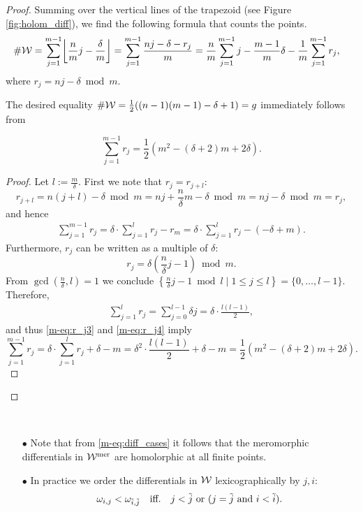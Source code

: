 \documentclass[main.tex]{subfiles}
\begin{document}
\begin{proof}
Summing over the vertical lines of the trapezoid
(see Figure \ref{fig:holom_diff}), we find the following formula that counts the points.
     \begin{align}\label{eq:r_j}
 \#\W & = \sum_{j = 1}^{m-1} \floor*{\frac{n}{m}j - \frac{\delta}{m}} = \sum_{j = 1}^{m-1} \frac{nj-\delta-r_j}{m} =
  \frac{n}{m} \sum_{j=1}^{m-1} j - \frac{m-1}{m}\delta - \frac{1}{m} \sum_{j=1}^{m-1} r_j,
     \end{align}
      where $r_j = nj - \delta  \bmod m$.

The desired equality  $\#\mathcal{W} = \frac{1}{2}((n-1)(m-1)-\delta+1) = g$ immediately follows from
\begin{lemma}
      \begin{equation*}\label{eq:r_j2}
       \sum_{j=1}^{m-1} r_j = \frac{1}{2}(m^2 - (\delta+2)m + 2\delta).
      \end{equation*}
\end{lemma}
\begin{proof}\let\qed\relax
      Let $l := \frac{m}{\delta}$. First we note that $r_j = r_{j+l}$:
      $$r_{j+l} = n(j+l) - \delta  \bmod m = nj + \frac{n}{\delta}m - \delta  \bmod m =  nj - \delta  \bmod m =  r_j,$$
      and hence
      \begin{align}\label{eq:r_j3}
       \sum_{j=1}^{m-1} r_j = \delta \cdot \sum_{j=1}^{l} r_j - r_m = \delta \cdot \sum_{j=1}^{l} r_j - (-\delta + m).
      \end{align}
      Furthermore, $r_j$ can be written as a multiple of $\delta$:
      $$r_j = \delta \left(\frac{n}{\delta}j - 1\right)  \bmod m.$$
      From $\gcd(\frac{n}{\delta},l) = 1$ we conclude $\left\{  \frac{n}{\delta}j - 1  \bmod l  \mid  1 \le j \le l  \right\} = \{  0,\dots,l-1  \}$.
      Therefore,
      \begin{align}\label{eq:r_j4}
       \sum_{j = 1}^l r_j = \sum_{j = 0}^{l-1} \delta j = \delta \cdot \frac{l(l-1)}{2},
      \end{align}
      and thus \eqref{m-eq:r_j3} and \eqref{m-eq:r_j4} imply
      $$\sum_{j=1}^{m-1} r_j = \delta \cdot \sum_{j=1}^{l} r_j + \delta - m = \delta^2 \cdot \frac{l(l-1)}{2} + \delta - m = \frac{1}{2}(m^2 - (\delta+2)m + 2\delta).$$
\end{proof}
\end{proof}

\begin{rmk}\
    \begin{itemize}
     \item[$\bullet$] Note that from \eqref{m-eq:diff_cases} it follows that the meromorphic differentials in $\mathcal{W}^{\text{mer}}$ are homolorphic at all finite points.
     \item[$\bullet$] In practice we order the differentials in $\mathcal{W}$ lexicographically by $j,i$:
     $$\omega_{i,j} < \omega_{\tilde{i},\tilde{j}} \quad \text{iff.} \quad j < \tilde{j}  \text{ or } (j = \tilde{j} \text{ and } i < \tilde{i}).$$ 
    \end{itemize}
\end{rmk}

\biblio
\end{document}
